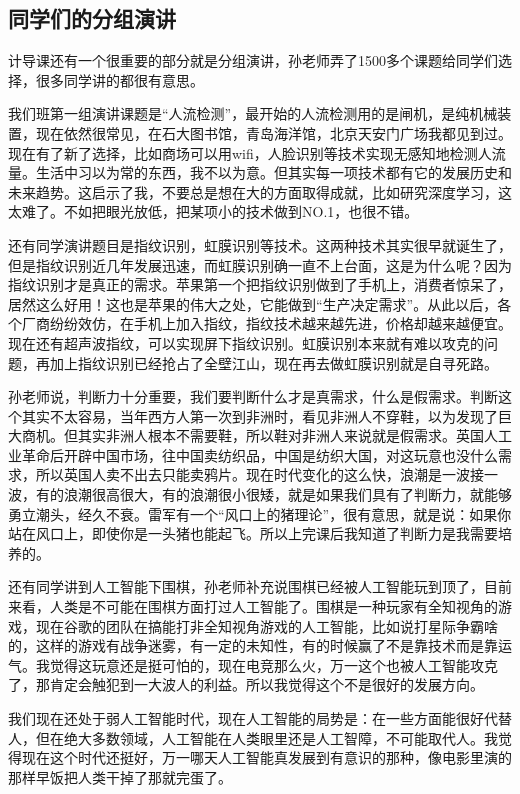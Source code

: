 \documentclass{article}
\begin{document}
\subsection{同学们的分组演讲}
计导课还有一个很重要的部分就是分组演讲，孙老师弄了1500多个课题给同学们选择，很多同学讲的都很有意思。\par 
我们班第一组演讲课题是“人流检测”，最开始的人流检测用的是闸机，是纯机械装置，现在依然很常见，在石大图书馆，青岛海洋馆，北京天安门广场我都见到过。现在有了新了选择，比如商场可以用wifi，人脸识别等技术实现无感知地检测人流量。生活中习以为常的东西，我不以为意。但其实每一项技术都有它的发展历史和未来趋势。这启示了我，不要总是想在大的方面取得成就，比如研究深度学习，这太难了。不如把眼光放低，把某项小的技术做到NO.1，也很不错。\par
还有同学演讲题目是指纹识别，虹膜识别等技术。这两种技术其实很早就诞生了，但是指纹识别近几年发展迅速，而虹膜识别确一直不上台面，这是为什么呢？因为指纹识别才是真正的需求。苹果第一个把指纹识别做到了手机上，消费者惊呆了，居然这么好用！这也是苹果的伟大之处，它能做到“生产决定需求”。从此以后，各个厂商纷纷效仿，在手机上加入指纹，指纹技术越来越先进，价格却越来越便宜。现在还有超声波指纹，可以实现屏下指纹识别。虹膜识别本来就有难以攻克的问题，再加上指纹识别已经抢占了全壁江山，现在再去做虹膜识别就是自寻死路。\par 
孙老师说，判断力十分重要，我们要判断什么才是真需求，什么是假需求。判断这个其实不太容易，当年西方人第一次到非洲时，看见非洲人不穿鞋，以为发现了巨大商机。但其实非洲人根本不需要鞋，所以鞋对非洲人来说就是假需求。英国人工业革命后开辟中国市场，往中国卖纺织品，中国是纺织大国，对这玩意也没什么需求，所以英国人卖不出去只能卖鸦片。现在时代变化的这么快，浪潮是一波接一波，有的浪潮很高很大，有的浪潮很小很矮，就是如果我们具有了判断力，就能够勇立潮头，经久不衰。雷军有一个“风口上的猪理论”，很有意思，就是说：如果你站在风口上，即使你是一头猪也能起飞。所以上完课后我知道了判断力是我需要培养的。\par 
还有同学讲到人工智能下围棋，孙老师补充说围棋已经被人工智能玩到顶了，目前来看，人类是不可能在围棋方面打过人工智能了。围棋是一种玩家有全知视角的游戏，现在谷歌的团队在搞能打非全知视角游戏的人工智能，比如说打星际争霸啥的，这样的游戏有战争迷雾，有一定的未知性，有的时候赢了不是靠技术而是靠运气。我觉得这玩意还是挺可怕的，现在电竞那么火，万一这个也被人工智能攻克了，那肯定会触犯到一大波人的利益。所以我觉得这个不是很好的发展方向。\par 
我们现在还处于弱人工智能时代，现在人工智能的局势是：在一些方面能很好代替人，但在绝大多数领域，人工智能在人类眼里还是人工智障，不可能取代人。我觉得现在这个时代还挺好，万一哪天人工智能真发展到有意识的那种，像电影里演的那样早饭把人类干掉了那就完蛋了。\par 
\end{document}
